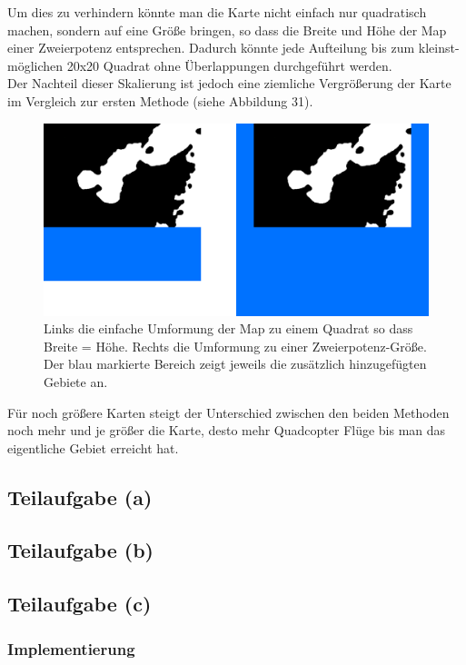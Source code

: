 \documentclass[a4paper,12pt]{article}
\begin{document}
Um dies zu verhindern könnte man die Karte nicht einfach nur quadratisch machen, sondern auf eine Größe bringen, so dass die Breite und Höhe der Map einer Zweierpotenz entsprechen. Dadurch könnte jede Aufteilung bis zum kleinst-möglichen 20x20 Quadrat ohne Überlappungen durchgeführt werden.
\\[0.4cm]
Der Nachteil dieser Skalierung ist jedoch eine ziemliche Vergrößerung der Karte im Vergleich zur ersten Methode (siehe Abbildung 31).
\begin{figure}[H]
\centering
    \includegraphics[width=.9\linewidth]{Bilder/Aufgabe3/Erweiterung_Karte.png}
    \caption{Links die einfache Umformung der Map zu einem Quadrat so dass Breite = Höhe. Rechts die Umformung zu einer Zweierpotenz-Größe. Der blau markierte Bereich zeigt jeweils die zusätzlich hinzugefügten Gebiete an.}
\end{figure}

Für noch größere Karten steigt der Unterschied zwischen den beiden Methoden noch mehr und je größer die Karte, desto mehr Quadcopter Flüge bis man das eigentliche Gebiet erreicht hat.
\\[0.4cm]

\subsection{Teilaufgabe (a)}

\subsection{Teilaufgabe (b)}

\subsection{Teilaufgabe (c)}
\subsubsection{Implementierung}
\end{document}
